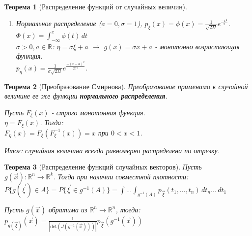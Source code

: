 \documentclass[14pt]{extarticle}
\theoremstyle{breakstyle}
\newtheorem{theorem}{Теорема}[subsection]
\begin{document}
\begin{theorem}[Распределение функций от случайных величин]
\begin{enumerate}
    \item Нормальное распределение ($a = 0, \sigma = 1$), $p_{\xi}(x) = \phi(x) = \frac{1}{\sqrt{2\Pi}}e^{\frac{-x^{2}}{2}}$.\\
          $\Phi(x) = \int_{-\infty}^{x}\phi(t) \, dt$ \\
          $\sigma > 0, a \in \mathbb{R}$: $\eta = \sigma \xi + a$ $\rightarrow$ $g(x) = \sigma x + a$ - монотонно возрастающая функция.\\
          $p_{\eta}(x) = \frac{1}{\sigma \sqrt{2\Pi}}e^{\frac{-(x-a)^2}{2\sigma^{2}}}$.
\end{enumerate}

\end{theorem}

\begin{theorem}[Преобразование Смирнова]

Преобразование применимо к случайной величине ее же функции \textbf{нормального распределения}.

\vspace{\baselineskip}

Пусть $F_{\xi}(x)$ - строго монотонная функция.\\
$\eta = F_{\xi}(x)$. Тогда:\\
$F_{\eta}(x) = F_{\xi}(F_{\xi}^{-1}(x)) = x$ при $0 < x < 1$.

\vspace{\baselineskip}

Итог: случайная величина всегда равномерно распределена по отрезку.

\end{theorem}

\begin{theorem}[Распределение функций случайных векторов]

Пусть $g(\vec{x}): \mathbb{R}^{n} \rightarrow \mathbb{R}^{k}$. Тогда при наличии совместной плотности:\\
$P\{g(\vec{\xi}) \in A\} = P\{\vec{\xi} \in g^{-1}(A)\} = \int ... \int_{g^{-1}(A)} p_{\vec{\xi}}(t_1, ..., t_n) \, dt_n ... \, dt_1$

\vspace{\baselineskip}

Пусть $g(\vec{x})$ обратима из $\mathbb{R}^{n} \rightarrow \mathbb{R}^{n}$, тогда:\\
$p_{g(\vec{\xi})}(\vec{x}) = \frac{1}{|\text{det}(J(g^{-1}(\vec{x})))|}p_{\vec{\xi}}(g^{-1}(\vec{x}))$

\end{theorem}
\end{document}
